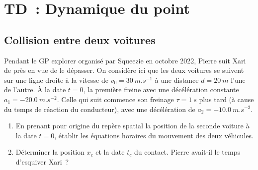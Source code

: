 \documentclass[a4paper, 12pt, final, garamond]{book}
\begin{document}
\setcounter{chapter}{1}

\chapter{TD~: Dynamique du point}


\section{Collision entre deux voitures}

Pendant le GP explorer organisé par Squeezie en octobre 2022, Pierre suit Xari
de près en vue de le dépasser. On considère ici que les deux voitures se suivent
sur une ligne droite à la vitesse de $v_0 = \SI{30}{m.s^{-1}}$ à une distance $d
= \SI{20}{m}$ l'une de l'autre. À la date $t=0$, la première freine avec une
décélération constante $a_1 = \SI{-20,0}{m.s^{-2}}$. Celle qui suit commence son
freinage $\tau = \SI{1}{s}$ plus tard (à cause du temps de réaction du
conducteur), avec une décélération de $a_2 = \SI{-10,0}{m.s^{-2}}$. \bigbreak

\begin{enumerate}
    \item En prenant pour origine du repère spatial la position de la seconde
        voiture à la date $t=0$, établir les équations horaires du mouvement des
        deux véhicules.
    \item Déterminer la position $x_c$ et la date $t_c$ du contact. Pierre
        avait-il le temps d'esquiver Xari~?
\end{enumerate}
\end{document}
